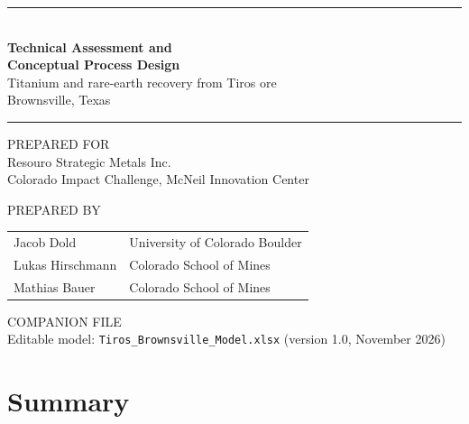 \documentclass[11pt,letterpaper]{article}
\begin{document}
\begin{titlepage}
\thispagestyle{empty}
\vspace*{2.2cm}
{\color{oxide}\rule{\linewidth}{1.2pt}}\\[10pt]
{\Huge\bfseries\color{oxide} Technical Assessment and\\[4pt] Conceptual Process Design}\\[14pt]
{\Large Titanium and rare-earth recovery from Tiros ore\\[3pt] Brownsville, Texas}\\[8pt]
{\color{oxide}\rule{\linewidth}{0.6pt}}

\vspace{1.4cm}
{\small\color{muted} PREPARED FOR}\\[2pt]
{\large Resouro Strategic Metals Inc.}\\[2pt]
Colorado Impact Challenge, McNeil Innovation Center

\vspace{0.9cm}
{\small\color{muted} PREPARED BY}\\[4pt]
\begin{tabular}{@{}ll@{}}
Jacob Dold & University of Colorado Boulder\\
Lukas Hirschmann & Colorado School of Mines\\
Mathias Bauer & Colorado School of Mines\\
\end{tabular}

\vspace{0.9cm}
{\small\color{muted} COMPANION FILE}\\[2pt]
Editable model: \texttt{Tiros\_Brownsville\_Model.xlsx} (version 1.0, November 2026)

\end{titlepage}

\setcounter{page}{2}%
\thispagestyle{fancy}
\tableofcontents
\newpage

\section*{Summary}\label{sec:summary}
\end{document}
